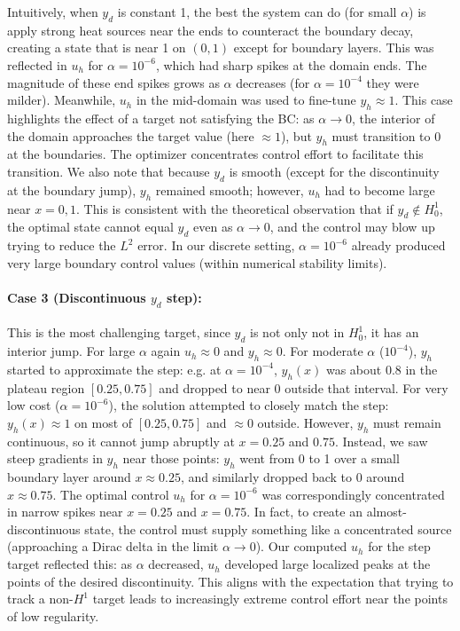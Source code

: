 Intuitively, when $y_d$ is constant 1, the best the system can do (for small $\alpha$) is apply strong heat sources near the ends to counteract the boundary decay, creating a state that is near 1 on $(0,1)$ except for boundary layers. This was reflected in $u_h$ for $\alpha=10^{-6}$, which had sharp spikes at the domain ends. The magnitude of these end spikes grows as $\alpha$ decreases (for $\alpha=10^{-4}$ they were milder). Meanwhile, $u_h$ in the mid-domain was used to fine-tune $y_h\approx 1$. This case highlights the effect of a target not satisfying the BC: as $\alpha\to0$, the interior of the domain approaches the target value (here $\approx 1$), but $y_h$ must transition to 0 at the boundaries. The optimizer concentrates control effort to facilitate this transition. We also note that because $y_d$ is smooth (except for the discontinuity at the boundary jump), $y_h$ remained smooth; however, $u_h$ had to become large near $x=0,1$. This is consistent with the theoretical observation that if $y_d\notin H^1_0$, the optimal state cannot equal $y_d$ even as $\alpha\to0$, and the control may blow up trying to reduce the $L^2$ error. In our discrete setting, $\alpha=10^{-6}$ already produced very large boundary control values (within numerical stability limits).

\paragraph{Case 3 (Discontinuous $y_d$ step):} This is the most challenging target, since $y_d$ is not only not in $H^1_0$, it has an interior jump. For large $\alpha$ again $u_h\approx0$ and $y_h\approx0$. For moderate $\alpha$ ($10^{-4}$), $y_h$ started to approximate the step: e.g. at $\alpha=10^{-4}$, $y_h(x)$ was about 0.8 in the plateau region $[0.25,0.75]$ and dropped to near 0 outside that interval. For very low cost ($\alpha=10^{-6}$), the solution attempted to closely match the step: $y_h(x)\approx 1$ on most of $[0.25,0.75]$ and $\approx 0$ outside. However, $y_h$ must remain continuous, so it cannot jump abruptly at $x=0.25$ and $0.75$. Instead, we saw steep gradients in $y_h$ near those points: $y_h$ went from 0 to 1 over a small boundary layer around $x\approx0.25$, and similarly dropped back to 0 around $x\approx0.75$. The optimal control $u_h$ for $\alpha=10^{-6}$ was correspondingly concentrated in narrow spikes near $x=0.25$ and $x=0.75$. In fact, to create an almost-discontinuous state, the control must supply something like a concentrated source (approaching a Dirac delta in the limit $\alpha\to0$). Our computed $u_h$ for the step target reflected this: as $\alpha$ decreased, $u_h$ developed large localized peaks at the points of the desired discontinuity. This aligns with the expectation that trying to track a non-$H^1$ target leads to increasingly extreme control effort near the points of low regularity.

